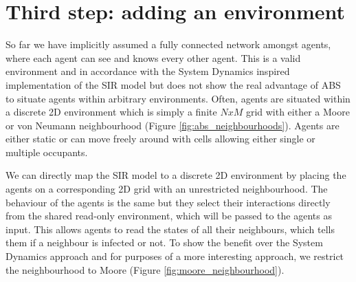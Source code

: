 \section{Third step: adding an environment}
\label{sec:adding_env}
So far we have implicitly assumed a fully connected network amongst agents, where each agent can see and knows every other agent. This is a valid environment and in accordance with the System Dynamics inspired implementation of the SIR model but does not show the real advantage of ABS to situate agents within arbitrary environments. Often, agents are situated within a discrete 2D environment \cite{epstein_growing_1996} which is simply a finite $N x M$ grid with either a Moore or von Neumann neighbourhood (Figure \ref{fig:abs_neighbourhoods}). Agents are either static or can move freely around with cells allowing either single or multiple occupants.

We can directly map the SIR model to a discrete 2D environment by placing the agents on a corresponding 2D grid with an unrestricted neighbourhood. The behaviour of the agents is the same but they select their interactions directly from the shared read-only environment, which will be passed to the agents as input. This allows agents to read the states of all their neighbours, which tells them if a neighbour is infected or not. To show the benefit over the System Dynamics approach  and for purposes of a more interesting approach, we restrict the neighbourhood to Moore (Figure \ref{fig:moore_neighbourhood}).

